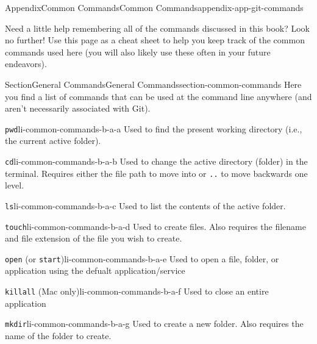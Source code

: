 \documentclass[oneside,10pt,]{book}
\newcommand{\mono}[1]{\texttt{#1}}
\begin{document}
\begin{appendixptx}{Appendix}{Common Commands}{}{Common Commands}{}{}{appendix-app-git-commands}
\renewcommand*{\appendixname}{Appendix}
\begin{introduction}{}%
Need a little help remembering all of the commands discussed in this book? Look no further! Use this page as a cheat sheet to help you keep track of the common commands used here (you will also likely use these often in your future endeavors).%
\end{introduction}%
%
%
\typeout{************************************************}
\typeout{************************************************}
%
\begin{sectionptx}{Section}{General Commands}{}{General Commands}{}{}{section-common-commands}
Here you find a list of commands that can be used at the command line anywhere (and aren't necessarily associated with Git).%
\begin{descriptionlist}
\begin{dlimedium}{\mono{pwd}}{li-common-commands-b-a-a}%
Used to find the present working directory (i.e.\@, the current active folder).%
\end{dlimedium}%
\begin{dlimedium}{\mono{cd}}{li-common-commands-b-a-b}%
Used to change the active directory (folder) in the terminal. Requires either the file path to move into or \mono{..} to move backwards one level.%
\end{dlimedium}%
\begin{dlimedium}{\mono{ls}}{li-common-commands-b-a-c}%
Used to list the contents of the active folder.%
\end{dlimedium}%
\begin{dlimedium}{\mono{touch}}{li-common-commands-b-a-d}%
Used to create files. Also requires the filename and file extension of the file you wish to create.%
\end{dlimedium}%
\begin{dlimedium}{\mono{open} (or \mono{start})}{li-common-commands-b-a-e}%
Used to open a file, folder, or application using the defualt application\slash{}service%
\end{dlimedium}%
\begin{dlimedium}{\mono{killall} (Mac only)}{li-common-commands-b-a-f}%
Used to close an entire application%
\end{dlimedium}%
\begin{dlimedium}{\mono{mkdir}}{li-common-commands-b-a-g}%
Used to create a new folder. Also requires the name of the folder to create.%

\end{dlimedium}
\end{descriptionlist}
\end{sectionptx}
\end{appendixptx}
\end{document}
